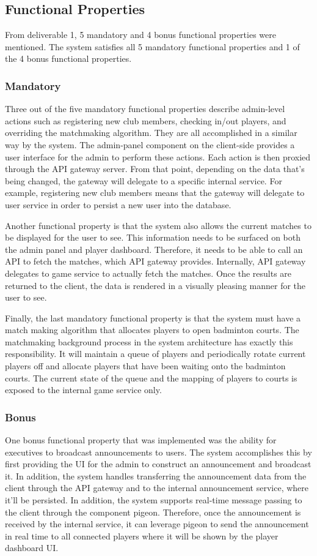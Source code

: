 \documentclass{article}
\begin{document}
\subsection{Functional Properties}
From deliverable 1, 5 mandatory and 4 bonus functional properties were mentioned. The system satisfies all 5 mandatory functional properties and 1 of the 4 bonus functional properties.

\subsubsection{Mandatory}
Three out of the five mandatory functional properties describe admin-level actions such as registering new club members, checking in/out players, and overriding the matchmaking algorithm. They are all accomplished in a similar way by the system. The admin-panel component on the client-side provides a user interface for the admin to perform these actions. Each action is then proxied through the API gateway server. From that point, depending on the data that's being changed, the gateway will delegate to a specific internal service. For example, registering new club members means that the gateway will delegate to user service in order to persist a new user into the database.

Another functional property is that the system also allows the current matches to be displayed for the user to see. This information needs to be surfaced on both the admin panel and player dashboard. Therefore, it needs to be able to call an API to fetch the matches, which API gateway provides. Internally, API gateway delegates to game service to actually fetch the matches. Once the results are returned to the client, the data is rendered in a visually pleasing manner for the user to see.

Finally, the last mandatory functional property is that the system must have a match making algorithm that allocates players to open badminton courts. The matchmaking background process in the system architecture has exactly this responsibility. It will maintain a queue of players and periodically rotate current players off and allocate players that have been waiting onto the badminton courts. The current state of the queue and the mapping of players to courts is exposed to the internal game service only.

\subsubsection{Bonus}
One bonus functional property that was implemented was the ability for executives to broadcast announcements to users. The system accomplishes this by first providing the UI for the admin to construct an announcement and broadcast it. In addition, the system handles transferring the announcement data from the client through the API gateway and to the internal announcement service, where it'll be persisted. In addition, the system supports real-time message passing to the client through the component pigeon. Therefore, once the announcement is received by the internal service, it can leverage pigeon to send the announcement in real time to all connected players where it will be shown by the player dashboard UI.
\end{document}
